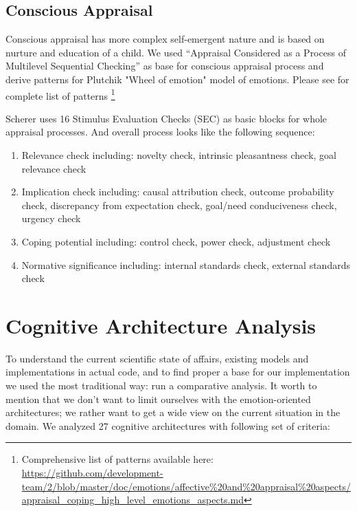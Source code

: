 \subsection{Conscious Appraisal}

Conscious appraisal has more complex self-emergent nature and is based on nurture and education of a child. We used ``Appraisal Considered as a Process of Multilevel Sequential Checking'' \cite{appraisal_considered_as_a_process} as base for conscious appraisal process and derive patterns for Plutchik "Wheel of emotion" model of emotions. Please see for complete list of patterns
\footnote{Comprehensive list of patterns available here: \url{
https://github.com/development-team/2/blob/master/doc/emotions/affective\%20and\%20appraisal\%20aspects/appraisal_coping_high_level_emotions_aspects.md}}

Scherer uses 16 Stimulus Evaluation Checks (SEC) as basic blocks for whole appraisal processes. And overall process looks like the following sequence:

\begin{enumerate}
 \item  Relevance check including: novelty check, intrinsic pleasantness check, goal relevance check
 \item  Implication check including: causal attribution check, outcome probability check, discrepancy from expectation check, goal/need conduciveness check, urgency check
 \item  Coping potential including: control check, power check, adjustment check
 \item  Normative significance including: internal standards check, external standards check
\end{enumerate}

\section{Cognitive Architecture Analysis}

To understand the current scientific state of affairs, existing models and implementations in actual code, and to find proper a base for our implementation we used the most traditional way: run a comparative analysis. It worth to mention that we don't want to limit ourselves with the emotion-oriented architectures; we rather want to get a wide view on the current situation in the domain. We analyzed 27 cognitive architectures with following set of criteria:

